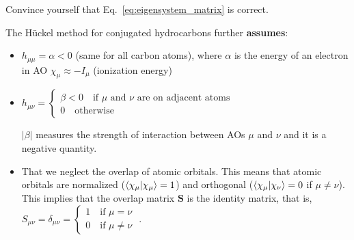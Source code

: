 \documentclass[../Main/chem532-notes.tex]{subfiles}
\begin{document}
\begin{problem}	
Convince yourself that Eq.~\ref{eq:eigensystem_matrix} is correct.
\end{problem}

The H\"{u}ckel method for conjugated hydrocarbons further \textbf{assumes}:
\begin{itemize}
\item $h_{\mu\mu} = \alpha < 0$ (same for all carbon atoms), where $\alpha$ is the energy of an electron in AO $\chi_\mu \approx - I_{\mu}$  (ionization energy)
\item $h_{\mu\nu} =
\begin{cases} \beta < 0 \quad \text{if $\mu$ and $\nu$ are on adjacent atoms}\\
0 \quad \text{otherwise}
\end{cases}$

$|\beta|$ measures the strength of interaction between AOs $\mu$ and $\nu$ and it is a negative quantity.

\item That we neglect the overlap of atomic orbitals. This means that atomic orbitals are normalized ($\braket{\chi_\mu | \chi_\mu} = 1$) and orthogonal ($\braket{\chi_\mu | \chi_\nu} = 0$ if $\mu \neq \nu$).
This implies that the overlap matrix $\mathbf{S}$ is the identity matrix, that is, $S_{\mu\nu} = \delta_{\mu\nu} = \begin{cases}1 \quad \text{if } \mu = \nu\\
0 \quad \text{if } \mu \neq \nu
\end{cases}$ .
\end{itemize}
\end{document}
